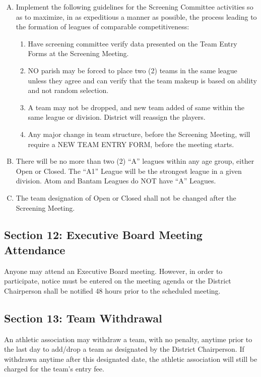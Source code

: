 \begin{enumerate}[A.]
    \item Implement the following guidelines for the Screening Committee activities so as to maximize, in as expeditious a manner as possible, the process leading to the formation of leagues of comparable competitiveness:
    \begin{enumerate}[1.]
        \item Have screening committee verify data presented on the Team Entry Forms at the Screening Meeting.
        \item NO parish may be forced to place two (2) teams in the same league unless they agree and can verify that the team makeup is based on ability and not random selection.
        \item A team may not be dropped, and new team added of same within the same league or division. District will reassign the players.
        \item Any major change in team structure, before the Screening Meeting, will require a NEW TEAM ENTRY FORM, before the meeting starts.
    \end{enumerate}
    \item There will be no more than two (2) ``A'' leagues within any age group, either Open or Closed.  The ``A1'' League will be the strongest league in a given division.  Atom and Bantam Leagues do NOT have “A” Leagues.
    \item The team designation of Open or Closed shall not be changed after the Screening Meeting.
\end{enumerate}

\subsection{Section 12: Executive Board Meeting Attendance}
Anyone may attend an Executive Board meeting.  However, in order to participate, notice must be entered on the meeting agenda or the District Chairperson shall be notified 48 hours prior to the scheduled meeting.

\subsection{Section 13: Team Withdrawal}
An athletic association may withdraw a team, with no penalty, anytime prior to the last day to add/drop a team as designated by the District Chairperson.  If withdrawn anytime after this designated date, the athletic association will still be charged for the team's entry fee.


    
    
    

\backmatter

